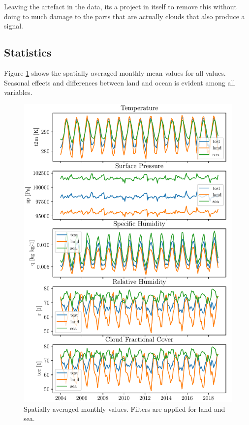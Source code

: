 Leaving the artefact in the data, its a project in itself to remove this without doing to much damage to the parts that are actually clouds that also produce a signal.

\subsection{Statistics}
Figure \ref{fig:monthly_mean_ts_vars} shows the spatially averaged monthly mean values for all values. Seasonal effects and differences between land and ocean is evident among all variables.

\begin{figure}[ht]
    \centering
    \includegraphics{python_figs/monthly_means.pdf}
    \caption{Spatially averaged monthly values. Filters are applied for land and sea.}
    \label{fig:monthly_mean_ts_vars}
\end{figure}

